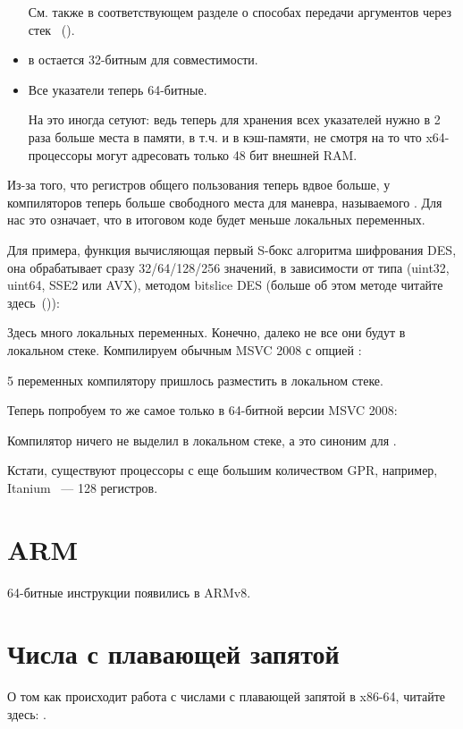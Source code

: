 \begin{itemize}
См. также в соответствующем разделе о способах передачи аргументов через стек ~().

\item
\Tint в \CCpp остается 32-битным для совместимости.

\item
Все указатели теперь 64-битные.

На это иногда сетуют: ведь теперь для хранения всех указателей нужно в 2 раза больше места 
в памяти, в т.ч. и в кэш-памяти, не смотря на то что x64-процессоры могут адресовать только 48 бит
внешней \ac{RAM}.

\end{itemize}

Из-за того, что регистров общего пользования теперь вдвое больше, у компиляторов теперь больше 
свободного места для маневра, называемого .
Для нас это означает, что в итоговом коде будет меньше локальных переменных.

Для примера, функция вычисляющая первый S-бокс алгоритма шифрования DES, 
она обрабатывает сразу 32/64/128/256 значений, в зависимости от типа  (uint32, uint64, SSE2 или AVX), 
методом bitslice DES (больше об этом методе читайте здесь~()):



Здесь много локальных переменных. Конечно, далеко не все они будут в локальном стеке. 
Компилируем обычным MSVC 2008 с опцией :



5 переменных компилятору пришлось разместить в локальном стеке.

Теперь попробуем то же самое только в 64-битной версии MSVC 2008:



Компилятор ничего не выделил в локальном стеке, а  это синоним для .

\iffalse
Кстати, видно, что функция сохраняет регистры \RCX, \RDX в отведенных для 
этого вызываемой функцией местах, 
а \Reg{8} и \Reg{9} не сохраняет, а начинает использовать их сразу.

\fi

Кстати, существуют процессоры с еще большим количеством \ac{GPR}, например, 
Itanium ~--- 128 регистров.

\section{ARM}

64-битные инструкции появились в ARMv8.

\section{Числа с плавающей запятой}

О том как происходит работа с числами с плавающей запятой в x86-64, читайте здесь: .

